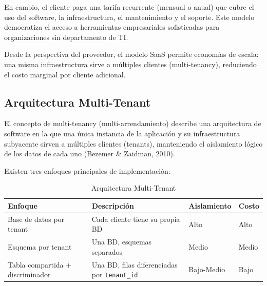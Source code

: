 En cambio, el cliente paga una tarifa recurrente (mensual o anual) que cubre el uso del software, la infraestructura, el mantenimiento y el soporte. Este modelo democratiza el acceso a herramientas empresariales sofisticadas para organizaciones sin departamento de TI.

Desde la perspectiva del proveedor, el modelo SaaS permite economías de escala: una misma infraestructura sirve a múltiples clientes (multi-tenancy), reduciendo el costo marginal por cliente adicional.

\subsection{Arquitectura Multi-Tenant}\label{arquitectura-multi-tenant}

El concepto de multi-tenancy (multi-arrendamiento) describe una arquitectura de software en la que una única instancia de la aplicación y su infraestructura subyacente sirven a múltiples clientes (tenants), manteniendo el aislamiento lógico de los datos de cada uno (Bezemer \& Zaidman, 2010).

Existen tres enfoques principales de implementación:

\begin{longtable}[]{@{}
  >{\raggedright\arraybackslash}p{}
  >{\raggedright\arraybackslash}p{}
  >{\raggedright\arraybackslash}p{}
  >{\raggedright\arraybackslash}p{}@{}}
\caption[Arquitectura Multi-Tenant]{Arquitectura Multi-Tenant}\tabularnewline
\toprule\noalign{}
\begin{minipage}[b]{\linewidth}\raggedright
Enfoque
\end{minipage} & \begin{minipage}[b]{\linewidth}\raggedright
Descripción
\end{minipage} & \begin{minipage}[b]{\linewidth}\raggedright
Aislamiento
\end{minipage} & \begin{minipage}[b]{\linewidth}\raggedright
Costo
\end{minipage} \\
\midrule\noalign{}
\endhead
\bottomrule\noalign{}
\endlastfoot
Base de datos por tenant & Cada cliente tiene su propia BD & Alto & Alto \\
Esquema por tenant & Una BD, esquemas separados & Medio & Medio \\
Tabla compartida + discriminador & Una BD, filas diferenciadas por \texttt{tenant\_id} & Bajo-Medio & Bajo \\
\end{longtable}


